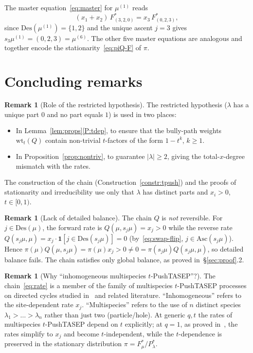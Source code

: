 \documentclass[12pt]{article}
\theoremstyle{definition}
\newtheorem{remark}[theorem]{Remark}
\begin{document}
The master equation~\eqref{eq:master} for $\mu^{(1)}$ reads
\[
(x_1+x_2)\,F^*_{(3,2,0)}=x_3\,F^*_{(0,2,3)},
\]
since $\mathrm{Des}(\mu^{(1)})=\{1,2\}$ and the unique ascent $j=3$ gives
$s_3\mu^{(1)}=(0,2,3)=\mu^{(6)}$. The other five master equations are
analogous and together encode the stationarity~\eqref{eq:piQ-F} of $\pi$.

\section{Concluding remarks}

\begin{remark}[Role of the restricted hypothesis]
The restricted hypothesis ($\lambda$ has a unique part $0$ and no part
equals $1$) is used in two places:
\begin{itemize}[leftmargin=2em]
\item In Lemma~\ref{lem:props}\ref{P:tdep}, to ensure that the bully-path
weights $\mathrm{wt}_t(Q)$ contain non-trivial $t$-factors of the form
$1-t^k$, $k\ge 1$.
\item In Proposition~\ref{prop:nontriv}, to guarantee $|\lambda|\ge 2$,
giving the total-$x$-degree mismatch with the rates.
\end{itemize}
The construction of the chain (Construction~\ref{constr:tpush}) and the
proofs of stationarity and irreducibility use only that $\lambda$ has
distinct parts and $x_i>0$, $t\in[0,1)$.
\end{remark}

\begin{remark}[Lack of detailed balance]
The chain $Q$ is \emph{not} reversible. For $j\in\mathrm{Des}(\mu)$, the
forward rate is $Q(\mu,s_j\mu)=x_j>0$ while the reverse rate
$Q(s_j\mu,\mu)=x_j\cdot\mathbf{1}[j\in\mathrm{Des}(s_j\mu)]=0$
(by~\eqref{eq:swap-flip}, $j\in\mathrm{Asc}(s_j\mu)$). Hence
$\pi(\mu)Q(\mu,s_j\mu)=\pi(\mu)x_j>0\neq 0=\pi(s_j\mu)Q(s_j\mu,\mu)$, so
detailed balance fails. The chain satisfies only global balance, as
proved in~\S\ref{sec:proof}.2.
\end{remark}

\begin{remark}[Why ``inhomogeneous multispecies $t$-PushTASEP''?]
The chain~\eqref{eq:rate} is a member of the family of multispecies
$t$-PushTASEP processes on directed cycles studied in~\cite{CMW} and
related literature. ``Inhomogeneous'' refers to the site-dependent rate
$x_j$. ``Multispecies'' refers to the use of $n$ distinct species
$\lambda_1>\dots>\lambda_n$ rather than just two (particle/hole). At
generic $q,t$ the rates of multispecies $t$-PushTASEP depend on $t$
explicitly; at $q=1$, as proved in~\cite[Section~6]{CMW}, the rates
simplify to $x_j$ and become $t$-independent, while the
$t$-dependence is preserved in the stationary distribution
$\pi=F^*_\mu/P^*_\lambda$.
\end{remark}
\end{document}
